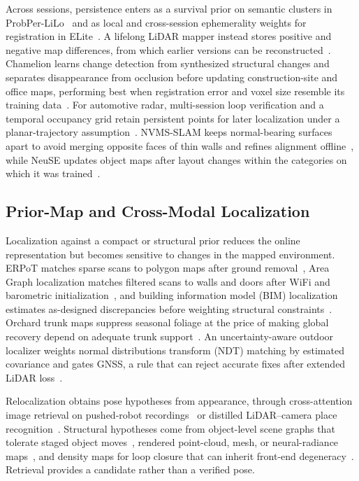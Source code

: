 Across sessions, persistence enters as a survival prior on semantic clusters in ProbPer-LiLo~\cite{P_E16} and as local and cross-session ephemerality weights for registration in ELite~\cite{P_E18}. A lifelong LiDAR mapper instead stores positive and negative map differences, from which earlier versions can be reconstructed~\cite{P_E11}. Chamelion learns change detection from synthesized structural changes and separates disappearance from occlusion before updating construction-site and office maps, performing best when registration error and voxel size resemble its training data~\cite{P_R07}. For automotive radar, multi-session loop verification and a temporal occupancy grid retain persistent points for later localization under a planar-trajectory assumption~\cite{P_R09}. NVMS-SLAM keeps normal-bearing surfaces apart to avoid merging opposite faces of thin walls and refines alignment offline~\cite{P_S01}, while NeuSE updates object maps after layout changes within the categories on which it was trained~\cite{P_S34}.

\subsection{Prior-Map and Cross-Modal Localization}

Localization against a compact or structural prior reduces the online representation but becomes sensitive to changes in the mapped environment. ERPoT matches sparse scans to polygon maps after ground removal~\cite{P_M13}, Area Graph localization matches filtered scans to walls and doors after WiFi and barometric initialization~\cite{P_S03}, and building information model (BIM) localization estimates as-designed discrepancies before weighting structural constraints~\cite{P_S36}. Orchard trunk maps suppress seasonal foliage at the price of making global recovery depend on adequate trunk support~\cite{P_S22}. An uncertainty-aware outdoor localizer weights normal distributions transform (NDT) matching by estimated covariance and gates GNSS, a rule that can reject accurate fixes after extended LiDAR loss~\cite{P_M16}.

Relocalization obtains pose hypotheses from appearance, through cross-attention image retrieval on pushed-robot recordings~\cite{P_M21} or distilled LiDAR--camera place recognition~\cite{P_E56}. Structural hypotheses come from object-level scene graphs that tolerate staged object moves~\cite{P_M34}, rendered point-cloud, mesh, or neural-radiance maps~\cite{P_S26}, and density maps for loop closure that can inherit front-end degeneracy~\cite{P_S35}. Retrieval provides a candidate rather than a verified pose.

